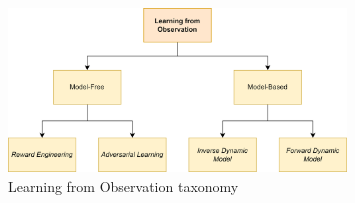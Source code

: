 \begin{figure}[t]
    \centering
    \includegraphics[width=0.8\textwidth]{figures/images/lfo_taxonomy.png}
    \caption{Learning from Observation taxonomy}
    \label{fig:lfo_taxonomy}
    
\end{figure}
